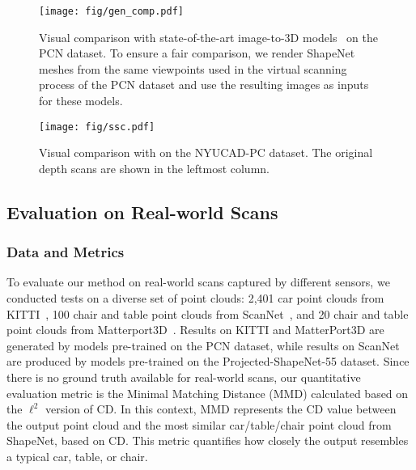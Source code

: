 \begin{figure*}[h]
  \centering
  \texttt{[image: fig/gen\_comp.pdf]}
\caption{Visual comparison with state-of-the-art image-to-3D models~\citep{li2024craftsman,sf3d2024,xu2024instantmesh} on the PCN dataset. To ensure a fair comparison, we render ShapeNet meshes from the same viewpoints used in the virtual scanning process of the PCN dataset and use the resulting images as inputs for these models.}
  \label{fig:gen_comp}
\end{figure*}

\begin{figure*}[h]
  \centering
  \texttt{[image: fig/ssc.pdf]}
\caption{Visual comparison with \citep{xu2023casfusionnet} on the NYUCAD-PC dataset. The original depth scans are shown in the leftmost column.}
  \label{fig:ssc}
\end{figure*}

\subsection{Evaluation on Real-world Scans}
\subsubsection{Data and Metrics}
To evaluate our method on real-world scans captured by different sensors, we conducted tests on a diverse set of point clouds: 2,401 car point clouds from KITTI~\citep{geiger2013vision}, 100 chair and table point clouds from ScanNet~\citep{dai2017scannet}, and 20 chair and table point clouds from Matterport3D~\citep{matterport3d}.
Results on KITTI and MatterPort3D are generated by models pre-trained on the PCN dataset,
while results on ScanNet are produced by models pre-trained on the Projected-ShapeNet-55 dataset.
Since there is no ground truth available for real-world scans, our quantitative evaluation metric is the Minimal Matching Distance (MMD) calculated based on the $\displaystyle \ell ^{2}$ version of CD. 
In this context, MMD represents the CD value between the output point cloud and the most similar car/table/chair point cloud from ShapeNet, based on CD. This metric quantifies how closely the output resembles a typical car, table, or chair.

